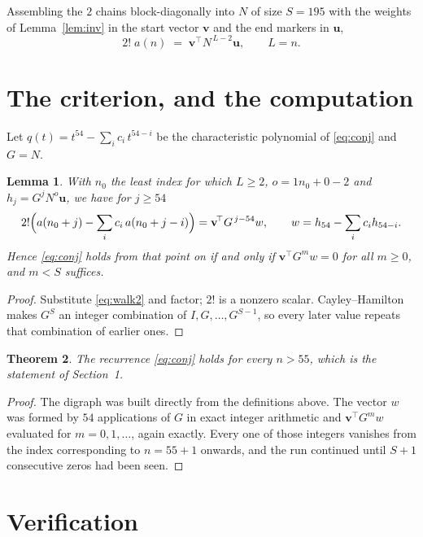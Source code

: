 \documentclass[11pt,a4paper]{article}
\theoremstyle{plain}
\newtheorem{theorem}{Theorem}
\newtheorem{lemma}[theorem]{Lemma}
\theoremstyle{definition}
\begin{document}
Assembling the $2$ chains block-diagonally into $N$ of size $S=195$ with the weights of
Lemma~\ref{lem:inv} in the start vector $\mathbf{v}$ and the end markers in
$\mathbf{u}$,
\begin{equation}\label{eq:walk2}
2!\;a(n)\;=\;\mathbf{v}^{\!\top}N^{\,L-2}\mathbf{u},\qquad L=n .
\end{equation}

\section{The criterion, and the computation}

Let $q(t)=t^{54}-\sum_i c_i\,t^{54-i}$ be the characteristic polynomial of
\eqref{eq:conj} and $G=N$.

\begin{lemma}\label{lem:crit}
With $n_0$ the least index for which $L\ge2$, $o=1n_0+0-2$ and
$h_j=G^{j}N^{o}\mathbf{u}$, we have for $j\ge54$
\[
2!\Bigl(a(n_0+j)-\sum_i c_i\,a(n_0+j-i)\Bigr)=\mathbf{v}^{\!\top}G^{\,j-54}w,
\qquad w=h_{54}-\sum_i c_i h_{54-i} .
\]
Hence \eqref{eq:conj} holds from that point on if and only if
$\mathbf{v}^{\!\top}G^{m}w=0$ for all $m\ge0$, and $m<S$ suffices.
\end{lemma}

\begin{proof}
Substitute \eqref{eq:walk2} and factor; $2!$ is a nonzero scalar. Cayley--Hamilton
makes $G^{S}$ an integer combination of $I,G,\dots,G^{S-1}$, so every later value repeats
that combination of earlier ones.
\end{proof}

\begin{theorem}
The recurrence \eqref{eq:conj} holds for every $n>55$, which is the statement of
Section~1.
\end{theorem}

\begin{proof}
The digraph was built directly from the definitions above. The vector $w$ was formed by
$54$ applications of $G$ in exact integer arithmetic and $\mathbf{v}^{\!\top}G^{m}w$
evaluated for $m=0,1,\dots$, again exactly. Every one of those integers vanishes from the
index corresponding to $n=55+1$ onwards, and the run continued until $S+1$ consecutive
zeros had been seen.
\end{proof}

\section{Verification}
\end{document}
